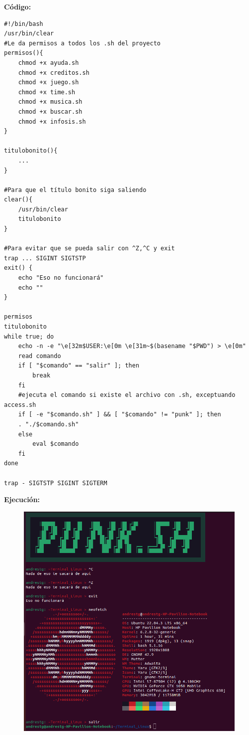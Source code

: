 \documentclass[letter,12pt]{article} %
\begin{document}
\textbf{Código:} \par
\begin{lstlisting}[style=BashInputStyle]
#!/bin/bash
/usr/bin/clear
#Le da permisos a todos los .sh del proyecto
permisos(){
    chmod +x ayuda.sh
    chmod +x creditos.sh
    chmod +x juego.sh
    chmod +x time.sh
    chmod +x musica.sh
    chmod +x buscar.sh
    chmod +x infosis.sh
}

titulobonito(){
    ...
}

#Para que el título bonito siga saliendo
clear(){
    /usr/bin/clear
    titulobonito
}

#Para evitar que se pueda salir con ^Z,^C y exit
trap ... SIGINT SIGTSTP
exit() {
    echo "Eso no funcionará"
    echo ""
}

permisos
titulobonito
while true; do
    echo -n -e "\e[32m$USER:\e[0m \e[31m~$(basename "$PWD") > \e[0m"
    read comando
    if [ "$comando" == "salir" ]; then
        break
    fi
    #ejecuta el comando si existe el archivo con .sh, exceptuando access.sh
    if [ -e "$comando.sh" ] && [ "$comando" != "punk" ]; then
	. "./$comando.sh"
    else
        eval $comando
    fi
done

trap - SIGTSTP SIGINT SIGTERM
\end{lstlisting}
\vspace{\baselineskip}

\textbf{Ejecución:} \par
\begin{figure}[H]
	\centering
	\includegraphics[scale=0.5]{imagenes/cli.png}
\end{figure}
\newpage
\end{document}
